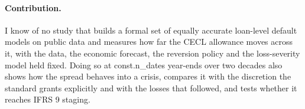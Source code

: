 \paragraph{Contribution.} I know of no study that builds a formal set of
equally accurate loan-level default models on public data and measures how far
the CECL allowance moves across it, with the data, the economic forecast, the
reversion policy and the loss-severity model held fixed. Doing so at
\num{const.n_dates} year-ends over two decades also shows how the spread
behaves into a crisis, compares it with the discretion the standard grants
explicitly and with the losses that followed, and tests whether it reaches
IFRS 9 staging.
